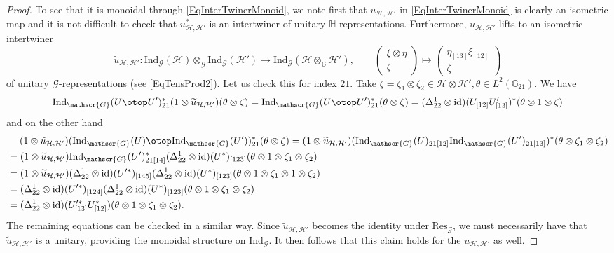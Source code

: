 \documentclass[reqno]{amsart}
\numberwithin{equation}{section}
\newcommand{\id}{\mathrm{id}}
\newcommand{\Hsp}{\mathcal{H}}
\newcommand{\G}{\mathbb{G}}
\newcommand{\Hh}{\mathbb{H}}
\newcommand{\msG}{\mathscr{G}}
\newcommand{\Ind}{\mathrm{Ind}}
\newcommand{\Res}{\mathrm{Res}}
\newcommand{\mc}{\mathcal}
\newcommand{\GG}{\mathbb{G}}
\begin{document}
\begin{proof}
To see that it is monoidal through \eqref{EqInterTwinerMonoid}, we note first that $u_{\Hsp,\Hsp'}$ in \eqref{EqInterTwinerMonoid} is clearly an isometric map and it is not difficult to check that $u_{\Hsp,\Hsp'}^*$ is an intertwiner of unitary $\Hh$-representations. Furthermore, $u_{\Hsp,\Hsp'}$ lifts to an isometric intertwiner 
\begin{equation}\label{EqInterTwinerMonoidAlt}
\widetilde{u}_{\Hsp,\Hsp'}\colon \Ind_{\msG}(\Hsp)\otimes_{\msG} \Ind_{\msG}(\Hsp') \rightarrow \Ind_{\msG}(\Hsp\otimes_{\G} \Hsp'),\qquad \begin{pmatrix} \xi\otimes \eta \\ \zeta\end{pmatrix} \mapsto \begin{pmatrix} \eta_{[13]}\xi_{[12]}\\ \zeta\end{pmatrix}
\end{equation}
of unitary $\msG$-representations (see \eqref{EqTensProd2}). Let us check this for index $21$. Take $\zeta=\zeta_1\otimes\zeta_2\in \mc{H}\otimes\mc{H}',\theta\in L^2(\GG_{21})$. We have
\[
\Ind_{\msG}(U\otop U')_{21}^* (1\otimes \widetilde{u}_{\mc{H},\mc{H}'}) (\theta\otimes \zeta)=
\Ind_{\msG}(U\otop U')_{21}^*(\theta\otimes \zeta)
=
(\Delta_{22}^1\otimes\id)(U_{[12]}U'_{[13]})^* 
(\theta\otimes 1 \otimes \zeta)
\]
and on the other hand
\[\begin{split}
&\quad\;
(1\otimes \widetilde{u}_{\mc{H},\mc{H}'})
(\Ind_{\msG}(U)\otop\Ind_{\msG}(U'))_{21}^*  (\theta\otimes \zeta)=
(1\otimes \widetilde{u}_{\mc{H},\mc{H}'})
(\Ind_{\msG}(U)_{21[12] } \Ind_{\msG}(U')_{21[13]})^*  (\theta\otimes \zeta_1\otimes\zeta_2)\\
&=
(1\otimes\widetilde{u}_{\mc{H},\mc{H}'})
\Ind_{\msG}(U')_{21 [14]}^*
(\Delta^1_{22}\otimes \id)(U^*)_{[123]}
(\theta\otimes 1\otimes \zeta_1\otimes\zeta_2)\\
&=
(1\otimes\widetilde{u}_{\mc{H},\mc{H}'})
(\Delta^1_{22}\otimes\id)(U'^*)_{[145]}
(\Delta^1_{22}\otimes \id)(U^*)_{[123]}
(\theta\otimes 1\otimes \zeta_1\otimes 1\otimes \zeta_2)\\
&=
(\Delta^1_{22}\otimes\id)(U'^*)_{[124]}
(\Delta^1_{22}\otimes \id)(U^*)_{[123]}
(\theta\otimes 1\otimes \zeta_1\otimes \zeta_2)\\
&=
(\Delta^1_{22}\otimes \id)( U'^*_{[13]}U^*_{[12]})
(\theta\otimes 1\otimes \zeta_1\otimes \zeta_2).
\end{split}\]
The remaining equations can be checked in a similar way. Since $\tilde{u}_{\Hsp,\Hsp'}$ becomes the identity under $\Res_{\msG}$, we must necessarily have that $\widetilde{u}_{\Hsp,\Hsp'}$ is a unitary, providing the monoidal structure on $\Ind_{\msG}$. It then follows that this claim holds for the $u_{\Hsp,\Hsp'}$ as well. 
\end{proof}
\end{document}
